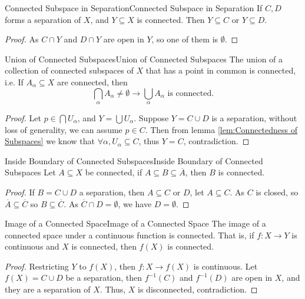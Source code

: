 \documentclass[../main.tex]{subfiles}
\begin{document}
\begin{lemma}{Connected Subspace in Separation}{Connected Subspace in Separation}
If $C,D$ forms a separation of $X$, and $Y \subseteq X$ is connected. Then $Y \subseteq C$ or $Y \subseteq D$.
\end{lemma}
\begin{proof}
As $C\cap Y$ and $D\cap Y$ are open in $Y$, so one of them is $\emptyset $.
\end{proof}

\begin{theorem}{Union of Connected Subspaces}{Union of Connected Subspaces}
The union of a collection of connected subspaces of $X$ that has a point in common is connected, i.e. If $A_{\alpha}\subseteq X$ are connected, then
\begin{equation*}
	\bigcap_{\alpha} A_{\alpha} \neq \emptyset \rightarrow \bigcup_{\alpha} A_{\alpha} \text{ is connected.}
\end{equation*}
\end{theorem}
\begin{proof}
	Let $p\in \bigcap U_{\alpha}$, and $Y = \bigcup U_{\alpha}$. Suppose $Y = C \cup D$ is a separation, without loss of generality, we can assume $p\in C$. Then from lemma \ref{lem:Connectedness of Subspaces} we know that $\forall \alpha, U_{\alpha} \subseteq C$, thus $Y = C$, contradiction.
\end{proof}

\begin{theorem}{Inside Boundary of Connected Subspaces}{Inside Boundary of Connected Subspaces}
Let $A \subseteq X$ be connected, if $A \subseteq B \subseteq \overline{A}$, then $B$ is connected.
\end{theorem}
\begin{proof}
	If $B = C\cup D$ a separation, then $A \subseteq C$ or $D$, let $A \subseteq C$. As $C$ is closed, so $\overline{A} \subseteq \overline{C}$ so $B \subseteq \overline{C}$. As $\overline{C}\cap D=\emptyset $, we have $D = \emptyset $.
\end{proof}

\begin{theorem}{Image of a Connected Space}{Image of a Connected Space}
The image of a connected space under a continuous function is connected. That is, if $f: X \rightarrow Y$ is continuous and $X$ is connected, then $f(X)$ is connected.
\end{theorem}
\begin{proof}
	Restricting $Y$ to $f(X)$, then $f: X \rightarrow f(X)$ is continuous. Let $f(X) = C \cup D$ be a separation, then $f^{-1}(C)$ and $f^{-1}(D)$ are open in $X$, and they are a separation of $X$. Thus, $X$ is disconnected, contradiction.
\end{proof}
\end{document}
